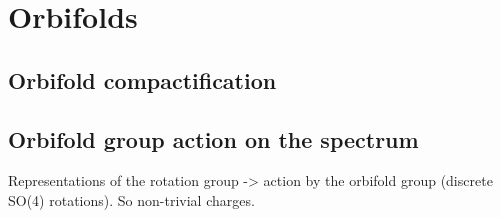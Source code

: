 

\chapter{Orbifolds}
\label{chap:results}
\pagestyle{fancy}

\section{Orbifold compactification}

\section{Orbifold group action on the spectrum}

Representations of the rotation group -> action by the orbifold group (discrete SO(4) rotations). So non-trivial charges.